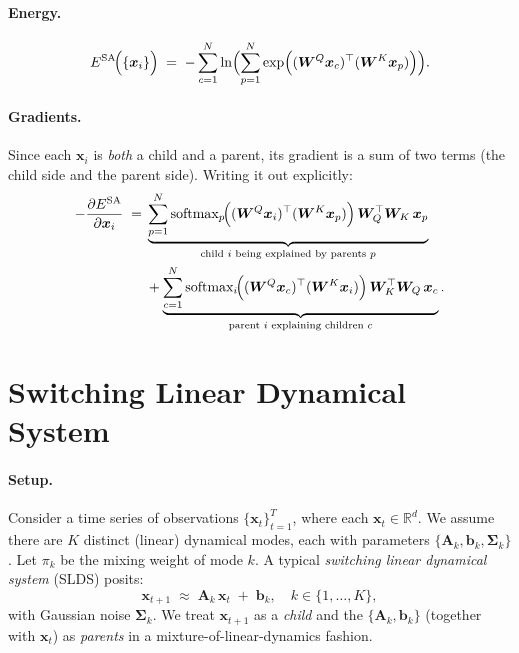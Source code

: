 \documentclass{article}
\begin{document}
\paragraph{Energy.}
\begin{equation}
E^{\mathrm{SA}}\!\Bigl(\{\bm{x}_i\}\Bigr)
\;=\;
-\sum_{c=1}^N
\ln \Bigl(\sum_{p=1}^N
\exp \Bigl(
(\bm{W}^Q \bm{x}_c)^\top
(\bm{W}^K \bm{x}_p)
\Bigr)\Bigr).
\end{equation}

\paragraph{Gradients.}
Since each \(\bm{x}_i\) is \emph{both} a child and a parent, its gradient is a sum of two terms (the child side and the parent side).  Writing it out explicitly:
\begin{equation}
    \begin{aligned}
    -\frac{\partial E^{\mathrm{SA}}}{\partial \bm{x}_i}
    \;=\;&
    \underbrace{
    \sum_{p=1}^N
    \text{softmax}_{p}\!\Bigl(
    (\bm{W}^Q \bm{x}_i)^\top
    (\bm{W}^K \bm{x}_p)
    \Bigr)\,
    \bm{W}_Q^\top \bm{W}_K \,\bm{x}_p
    }_{\text{child $i$ being explained by parents $p$}} \\
    &+
    \underbrace{
    \sum_{c=1}^N
    \text{softmax}_{i}\!\Bigl(
    (\bm{W}^Q \bm{x}_c)^\top
    (\bm{W}^K \bm{x}_i)
    \Bigr)\,
    \bm{W}_K^\top \bm{W}_Q \,\bm{x}_c
    }_{\text{parent $i$ explaining children $c$}}.
    \end{aligned}
    \end{equation}

    \section{Switching Linear Dynamical System}

\paragraph{Setup.}
Consider a time series of observations \(\{\bm{x}_t\}_{t=1}^T\), where each \(\bm{x}_t \in \mathbb{R}^d\).  
We assume there are \(K\) distinct (linear) dynamical modes, each with parameters \(\{\bm{A}_k, \bm{b}_k, \bm{\Sigma}_k\}\). Let \(\pi_k\) be the mixing weight of mode \(k\).  A typical \emph{switching linear dynamical system} (SLDS) posits:
\[
\bm{x}_{t+1}
\;\approx\;
\bm{A}_k\,\bm{x}_t \;+\; \bm{b}_k,
\quad
k \in \{1,\dots,K\},
\]
with Gaussian noise \(\bm{\Sigma}_k\).  
We treat \(\bm{x}_{t+1}\) as a \emph{child} and the \(\{\bm{A}_k, \bm{b}_k\}\) (together with \(\bm{x}_t\)) as \emph{parents} in a mixture-of-linear-dynamics fashion.
\end{document}
